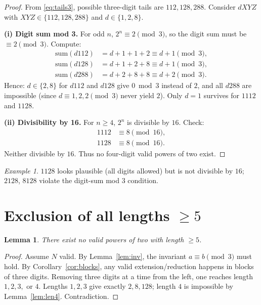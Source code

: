 \documentclass[12pt]{article}
\theoremstyle{plain}
\newtheorem{lemma}{Lemma}
\theoremstyle{remark}
\newtheorem*{example}{Example}
\begin{document}
\begin{proof}
From \eqref{eq:tails3}, possible three-digit tails are $112,128,288$.  
Consider $dXYZ$ with $XYZ\in\{112,128,288\}$ and $d\in\{1,2,8\}$.

\smallskip
\noindent\textbf{(i) Digit sum mod 3.}  
For odd $n$, $2^n\equiv2\pmod3$, so the digit sum must be $\equiv2\pmod3$.  
Compute:
\begin{align*}
\mathrm{sum}(d112)&=d+1+1+2\equiv d+1\pmod3,\\
\mathrm{sum}(d128)&=d+1+2+8\equiv d+1\pmod3,\\
\mathrm{sum}(d288)&=d+2+8+8\equiv d+2\pmod3.
\end{align*}
Hence: $d\in\{2,8\}$ for $d112$ and $d128$ give $0\bmod3$ instead of $2$, and all $d288$ are impossible (since $d\equiv1,2,2\pmod3$ never yield $2$).  
Only $d=1$ survives for $1112$ and $1128$.

\smallskip
\noindent\textbf{(ii) Divisibility by 16.}  
For $n\ge4$, $2^n$ is divisible by $16$.  
Check:
\begin{align*}
1112 &\equiv 8 \pmod{16},\\
1128 &\equiv 8 \pmod{16}.
\end{align*}
Neither divisible by $16$.  
Thus no four-digit valid powers of two exist.
\end{proof}

\begin{example}
$1128$ looks plausible (all digits allowed) but is not divisible by $16$; $2128$, $8128$ violate the digit-sum mod 3 condition.
\end{example}

\section{Exclusion of all lengths $\ge5$}
\begin{lemma}\label{lem:len5}
There exist no valid powers of two with length $\ge5$.
\end{lemma}

\begin{proof}
Assume $N$ valid.  
By Lemma~\ref{lem:inv}, the invariant $a\equiv b\pmod3$ must hold.  
By Corollary~\ref{cor:blocks}, any valid extension/reduction happens in blocks of three digits.  
Removing three digits at a time from the left, one reaches length $1,2,3,$ or $4$.  
Lengths $1,2,3$ give exactly $2,8,128$; length $4$ is impossible by Lemma~\ref{lem:len4}.  
Contradiction.
\end{proof}
\end{document}
